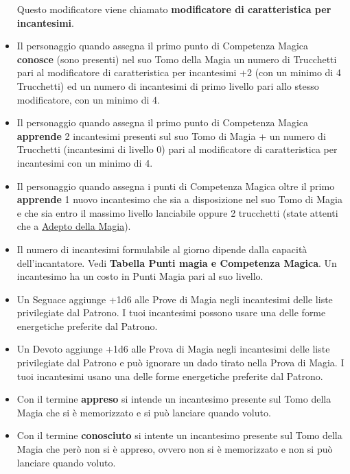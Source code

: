 \begin{multicols}{2}
\begin{itemize}[leftmargin=*]
Questo modificatore viene chiamato \textbf{modificatore di caratteristica per incantesimi}.
\item
Il personaggio quando assegna il primo punto di Competenza Magica \textbf{conosce} (sono presenti) nel suo Tomo della Magia un numero di Trucchetti pari al modificatore di caratteristica per incantesimi +2 (con un minimo di 4 Trucchetti) ed un numero di incantesimi di primo livello pari allo stesso modificatore, con un minimo di 4.
\item
Il personaggio quando assegna il primo punto di Competenza Magica \textbf{apprende} 2 incantesimi presenti sul suo Tomo di Magia + un numero di Trucchetti (incantesimi di livello 0) pari al modificatore di caratteristica per incantesimi con un minimo di 4.\label{incantesimicm1}\hypertarget{incantesimicm1}{}
\item
Il personaggio quando assegna i punti di Competenza Magica oltre il primo \textbf{apprende} 1 nuovo incantesimo che sia a disposizione nel suo Tomo di Magia e che sia entro il massimo livello lanciabile oppure 2 trucchetti (state attenti che a \hyperlink{adeptodellamagia}{Adepto della Magia}).
\item
Il numero di incantesimi formulabile al giorno dipende dalla capacità dell'incantatore. Vedi \textbf{Tabella Punti magia e Competenza Magica}. Un incantesimo ha un costo in Punti Magia pari al suo livello.
\item
Un Seguace aggiunge +1d6 alle Prove di Magia negli incantesimi delle liste privilegiate dal Patrono. I tuoi incantesimi possono usare una delle forme energetiche preferite dal Patrono.\label{listeprivilegiate}\hypertarget{listeprivilegiate}{}
\item
Un Devoto aggiunge +1d6 alle Prova di Magia negli incantesimi delle liste privilegiate dal Patrono e può ignorare un dado tirato nella Prova di Magia. I tuoi incantesimi usano una delle forme energetiche preferite dal Patrono.
\item
Con il termine \textbf{appreso} si intende un incantesimo presente sul Tomo della Magia che si è memorizzato e si può lanciare quando voluto.
\item
Con il termine \textbf{conosciuto} si intente un incantesimo presente sul Tomo della Magia che però non si è appreso, ovvero non si è memorizzato e non si può lanciare quando voluto.
\end{itemize}

\end{multicols}

